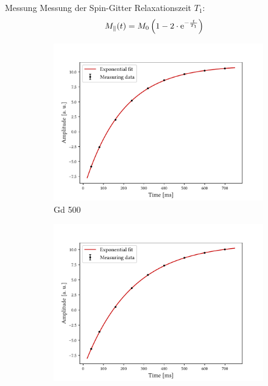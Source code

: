 %
%
\begin{frame}{Messung}
Messung der Spin-Gitter Relaxationszeit $T_1$:
	\begin{align*}
	M_\parallel (t)&=M_0\left(1-2\cdot\mathrm{e}^{-\frac{t}{T_1}}\right)
	\end{align*}
	\begin{figure}
	\centering
		\begin{subfigure}{.49\textwidth}
		\centering
		\includegraphics[scale=.36]{..//figures//f61_abb_1.pdf}
		\caption{Gd 500}
		\end{subfigure}
		\begin{subfigure}{.49\textwidth}
		\centering
		\includegraphics[scale=.36]{..//figures//f61_abb_1_600.pdf}

\end{subfigure}
\end{figure}
\end{frame}
